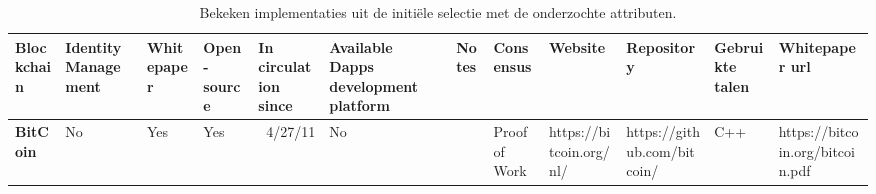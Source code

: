 \begin{table}[htbp]
  \centering
  \caption{Bekeken implementaties uit de initiële selectie met de onderzochte attributen.}
  \begin{adjustbox}{width=25cm, height=6cm, angle=270}
    \begin{tabular}{llllrlp{17.915em}rlrrr}
      \toprule
      \textcolor[rgb]{ .188,  .329,  .588}{\textbf{Blockchain}} & \textcolor[rgb]{ .188,  .329,  .588}{\textbf{ Identity Management}} & \textcolor[rgb]{ .188,  .329,  .588}{\textbf{Whitepaper}} & \textcolor[rgb]{ .188,  .329,  .588}{\textbf{Open-source}} & \multicolumn{1}{l}{\textcolor[rgb]{ .188,  .329,  .588}{\textbf{In circulation since}}} & \textcolor[rgb]{ .188,  .329,  .588}{\textbf{Available Dapps development platform}} & \textcolor[rgb]{ .188,  .329,  .588}{\textbf{Notes}} & \multicolumn{1}{l}{\textcolor[rgb]{ .188,  .329,  .588}{\textbf{Consensus}}} & \textcolor[rgb]{ .188,  .329,  .588}{\textbf{Website}} & \multicolumn{1}{l}{\textcolor[rgb]{ .188,  .329,  .588}{\textbf{Repository}}} & \multicolumn{1}{l}{\textcolor[rgb]{ .188,  .329,  .588}{\textbf{Gebruikte talen}}} & \multicolumn{1}{l}{\textcolor[rgb]{ .188,  .329,  .588}{\textbf{Whitepaper url}}} \\
      \midrule
      \rowcolor[rgb]{ .267,  .447,  .769} \textcolor[rgb]{ 1,  1,  1}{\textbf{BitCoin}} & \cellcolor[rgb]{ 1,  .78,  .808}\textcolor[rgb]{ .612,  0,  .024}{No} & \cellcolor[rgb]{ .776,  .937,  .808}\textcolor[rgb]{ 0,  .38,  0}{Yes} & \cellcolor[rgb]{ .776,  .937,  .808}\textcolor[rgb]{ 0,  .38,  0}{Yes} & \cellcolor[rgb]{ .851,  .882,  .949}\textcolor[rgb]{ .188,  .329,  .588}{4/27/11} & \cellcolor[rgb]{ 1,  .78,  .808}\textcolor[rgb]{ .612,  0,  .024}{No} & \multicolumn{1}{r}{\cellcolor[rgb]{ .851,  .882,  .949}\textcolor[rgb]{ .188,  .329,  .588}{}} & \multicolumn{1}{l}{\cellcolor[rgb]{ .851,  .882,  .949}\textcolor[rgb]{ .188,  .329,  .588}{Proof of Work}} & \cellcolor[rgb]{ .851,  .882,  .949}\textcolor[rgb]{ .188,  .329,  .588}{https://bitcoin.org/nl/} & \multicolumn{1}{l}{\cellcolor[rgb]{ .851,  .882,  .949}\textcolor[rgb]{ .188,  .329,  .588}{https://github.com/bitcoin/}} & \multicolumn{1}{l}{\cellcolor[rgb]{ .851,  .882,  .949}\textcolor[rgb]{ .188,  .329,  .588}{C++}} & \multicolumn{1}{l}{\cellcolor[rgb]{ .851,  .882,  .949}\textcolor[rgb]{ .188,  .329,  .588}{https://bitcoin.org/bitcoin.pdf}} \\

\end{tabular}
\end{adjustbox}
\end{table}
